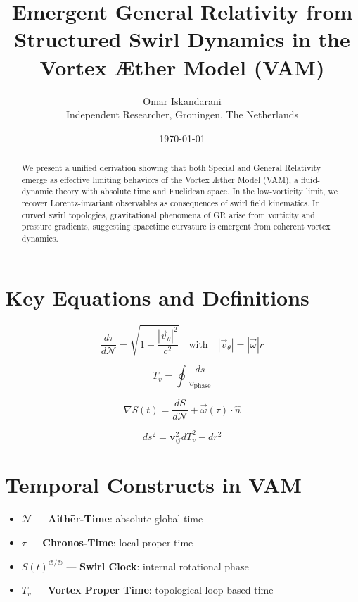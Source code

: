 \documentclass[12pt]{article}
\title{Emergent General Relativity from Structured Swirl Dynamics in the Vortex Æther Model (VAM)}
\author{Omar Iskandarani\\Independent Researcher, Groningen, The Netherlands}
\date{\today}
\begin{document}
\maketitle

\begin{abstract}
We present a unified derivation showing that both Special and General Relativity emerge as effective limiting behaviors of the Vortex Æther Model (VAM), a fluid-dynamic theory with absolute time and Euclidean space. In the low-vorticity limit, we recover Lorentz-invariant observables as consequences of swirl field kinematics. In curved swirl topologies, gravitational phenomena of GR arise from vorticity and pressure gradients, suggesting spacetime curvature is emergent from coherent vortex dynamics.
\end{abstract}

\section*{Key Equations and Definitions}

\begin{equation}
\boxed{
    \frac{d\tau}{d\mathcal{N}} = \sqrt{1 - \frac{|\vec{v}_\theta|^2}{c^2}}
} \quad \text{with} \quad |\vec{v}_\theta| = |\vec{\omega}| r
\label{eq:tau-dilation}
\end{equation}

\begin{equation}
\boxed{
    T_v = \oint \frac{ds}{v_\text{phase}}
}
\label{eq:vortex-proper-time}
\end{equation}

\begin{equation}
\boxed{
    \nabla S(t) = \frac{dS}{d\mathcal{N}} + \vec{\omega}(\tau) \cdot \hat{n}
}
\label{eq:swirl-clock-gradient}
\end{equation}

\begin{equation}
\boxed{
    ds^2 = \mathbf{v}_{\scriptscriptstyle\boldsymbol{\circlearrowleft}}^2 dT_v^2 - dr^2
}
\label{eq:swirl-metric}
\end{equation}

\section*{Temporal Constructs in VAM}

\begin{tcolorbox}[title=Temporal Modes in the Vortex Æther Model, colback=gray!10, colframe=black!70]
\begin{itemize}
    \item \( \mathcal{N} \) — \textbf{Aithēr-Time}: absolute global time
    \item \( \tau \) — \textbf{Chronos-Time}: local proper time
    \item \( S(t)^{\circlearrowleft/\circlearrowright} \) — \textbf{Swirl Clock}: internal rotational phase
    \item \( T_v \) — \textbf{Vortex Proper Time}: topological loop-based time
\end{itemize}
\end{tcolorbox}
\end{document}
